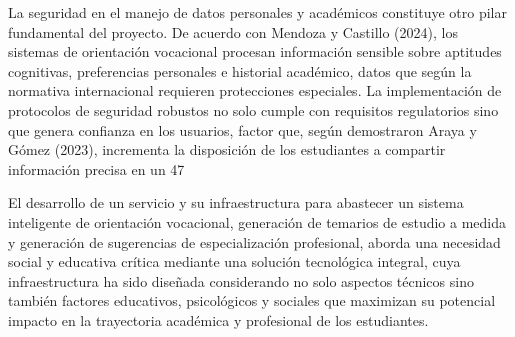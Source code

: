 La seguridad en el manejo de datos personales y académicos constituye otro pilar fundamental del proyecto. De acuerdo con Mendoza y Castillo (2024), los sistemas de orientación vocacional procesan información sensible sobre aptitudes cognitivas, preferencias personales e historial académico, datos que según la normativa internacional requieren protecciones especiales. La implementación de protocolos de seguridad robustos no solo cumple con requisitos regulatorios sino que genera confianza en los usuarios, factor que, según demostraron Araya y Gómez (2023), incrementa la disposición de los estudiantes a compartir información precisa en un 47%

El desarrollo de un servicio y su infraestructura para abastecer un sistema inteligente de orientación vocacional, generación de temarios de estudio a medida y generación de sugerencias de especialización profesional, aborda una necesidad social y educativa crítica mediante una solución tecnológica integral, cuya infraestructura ha sido diseñada considerando no solo aspectos técnicos sino también factores educativos, psicológicos y sociales que maximizan su potencial impacto en la trayectoria académica y profesional de los estudiantes.